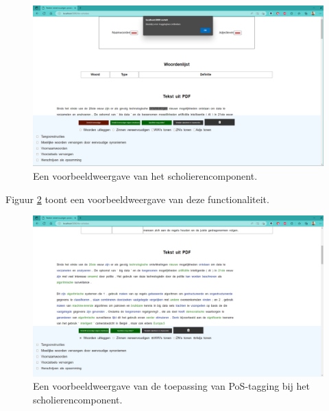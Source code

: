 \begin{center}
	\begin{figure}[H]
		\includegraphics[width=\linewidth]{img/proto-melding.png}
		\caption{Een voorbeeldweergave van het scholierencomponent.}
		\label{img:proto-homescreen-scholieren}
	\end{figure}
\end{center}

Figuur \ref{img:proto-pos-tagging-scholieren} toont een voorbeeldweergave van deze functionaliteit. 

\begin{center}
	\begin{figure}[H]
		\includegraphics[width=\linewidth]{img/proto-pos-tagging.png}
		\caption{Een voorbeeldweergave van de toepassing van PoS-tagging bij het scholierencomponent.}
		\label{img:proto-pos-tagging-scholieren}
	\end{figure}
\end{center}

